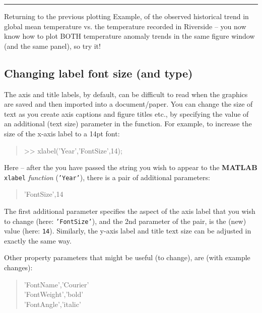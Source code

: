 \documentclass{tufte-book} %
\newenvironment{docspec}{\begin{quotation}\ttfamily\parskip0pt\parindent0pt\ignorespaces}{\end{quotation}}
\begin{document}
\vspace{1mm}
\noindent\rule{4cm}{0.5pt}
\vspace{2mm}

\noindent Returning to the previous plotting Example, of the observed historical trend in global mean temperature vs. the temperature recorded in Riverside -- you now know how to plot BOTH temperature anomaly trends in the same \textsf{figure window} (and the same panel), so try it!


\subsection{Changing label font size (and type)}

The axis and title labels, by default, can be difficult to read when the graphics are saved and then imported into a document/paper. You can change the size of text as you create axis captions and figure titles etc., by specifying the value of an additional (text size) parameter in the function. For example, to increase the size of the x-axis label to a 14pt font:

\begin{docspec}
>> xlabel('Year','FontSize',14);
\end{docspec}

Here -- after the you have passed the string you wish to appear to the \textbf{MATLAB} \texttt{xlabel} \textit{function} (\texttt{'Year'}), there is a pair of additional parameters:

\begin{docspec}
'FontSize',14
\end{docspec}

The first additional parameter specifies the aspect of the axis label that you wish to change (here: \texttt{'FontSize'}), and the 2nd parameter of the pair, is the (new) value (here: \texttt{14}). Similarly, the y-axis label and title text size can be adjusted in exactly the same way.

Other property parameters that might be useful (to change), are (with example changes):

\begin{docspec}
'FontName','Courier'\\
'FontWeight','bold'\\
'FontAngle','italic'
\end{docspec}
\end{document}
